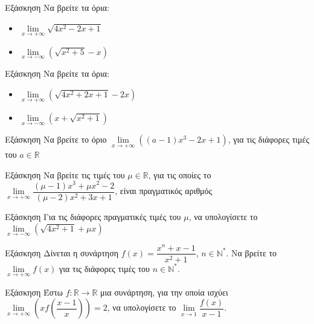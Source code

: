 \documentclass[greek]{beamer}
\begin{document}
\begin{frame}{Εξάσκηση}
      Να βρείτε τα όρια:
      \begin{itemize}
            \item $\lim\limits_{x \to +\infty}{ \sqrt{4x^2-2x+1} }$ \pause
            \item $\lim\limits_{x \to -\infty}{ \left( \sqrt{x^2+5} -x \right)  }$
      \end{itemize}
\end{frame}

\begin{frame}{Εξάσκηση}
      Να βρείτε τα όρια:
      \begin{itemize}
            \item $\lim\limits_{x \to +\infty}{ \left( \sqrt{4x^2+2x+1}-2x \right)  }$ \pause
            \item $\lim\limits_{x \to -\infty}{ \left( x+ \sqrt{x^2+1} \right)  }$
      \end{itemize}
\end{frame}

\begin{frame}{Εξάσκηση}
      Να βρείτε το όριο $\lim\limits_{x \to +\infty}{ \left( (a-1)x^3-2x+1 \right)  }$, για τις διάφορες τιμές του $a\in\mathbb{R}$
\end{frame}

\begin{frame}{Εξάσκηση}
      Να βρείτε τις τιμές του $μ\in\mathbb{R}$, για τις οποίες το $\lim\limits_{x \to +\infty}{ \dfrac{(μ-1)x^3+μx^2-2}{(μ-2)x^2+3x+1}  }$, είναι πραγματικός αριθμός
\end{frame}

\begin{frame}{Εξάσκηση}
      Για τις διάφορες πραγματικές τιμές του $μ$, να υπολογίσετε το $\lim\limits_{x \to -\infty}{ \left( \sqrt{4x^2+1}+μx \right)  }$
\end{frame}

\begin{frame}{Εξάσκηση}
      Δίνεται η συνάρτηση $f(x)=\dfrac{x^n+x-1}{x^2+1}$, $n\in\mathbb{N}^*$. Να βρείτε το $\lim\limits_{x \to +\infty}{ f(x) } $ για τις διάφορες τιμές του $n\in\mathbb{N}^*$.
\end{frame}

\begin{frame}{Εξάσκηση}
      Έστω $f:\mathbb{R}\to\mathbb{R}$ μια συνάρτηση, για την οποία ισχύει $\lim\limits_{x \to +\infty}{ \left( xf\left( \dfrac{x-1}{x} \right)  \right)  }=2$, να υπολογίσετε το $\lim\limits_{x \to 1}{ \dfrac{f(x)}{x-1} }$.
\end{frame}
\end{document}
